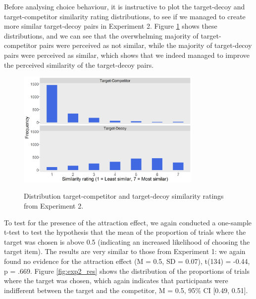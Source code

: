 \documentclass[11pt,a4paper]{article}
\begin{document}
Before analysing choice behaviour, it is instructive to plot the target-decoy and target-competitor similarity rating distributions, to see if we managed to create more similar target-decoy pairs in Experiment 2.  Figure \ref{fig:exp2_similarityratings} shows these distributions, and we can see that the overwhelming majority of target-competitor pairs were perceived as not similar, while the majority of target-decoy pairs were perceived as similar, which shows that we indeed managed to improve the perceived similarity of the target-decoy pairs.

\begin{figure}[htb!]
\centering
\captionsetup{justification=centering}
\caption{Distribution target-competitor and target-decoy similarity ratings from Experiment 2.}
\includegraphics[width=0.8\textwidth]{exp2_similarityratings.png}
\label{fig:exp2_similarityratings}
\end{figure}


To test for the presence of the attraction effect, we again conducted a one-sample t-test to test the hypothesis that the mean of the proportion of trials where the target was chosen  is above 0.5 (indicating an increased likelihood of choosing the target item). The results are very similar to those from Experiment 1: we again found no evidence for the attraction effect (M = 0.5, SD = 0.07), t(134) = -0.44, p = .669. Figure \ref{fig:exp2_res} shows the distribution of the proportions of trials where the target was chosen, which again indicates that participants were indifferent between the target and the competitor, M = 0.5, 95\% CI [0.49, 0.51].
\end{document}
